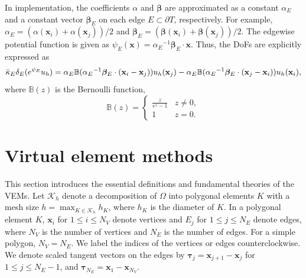 \documentclass[a4paper]{article}
\theoremstyle{plain}
\theoremstyle{definition}
\numberwithin{equation}{section}
\newcommand{\bx}{{\bf x}}
\begin{document}
In implementation, the coefficients $\alpha$ and $\bm{\beta}$ are approximated as a constant $\alpha_E$ and a constant vector $\bm{\beta}_E$ on each edge $E\subset\partial T$, respectively.
For example, $\alpha_E=(\alpha(\mathbf{x}_i)+\alpha(\mathbf{x}_j))/2$ and $\bm{\beta}_E=(\bm{\beta}(\mathbf{x}_i)+\bm{\beta}(\mathbf{x}_j))/2$.
The edgewise potential function is given as $\psi_E(\mathbf{x})={\alpha_E}^{-1}\bm{\beta}_E\cdot\mathbf{x}$.
Thus, the DoFs are explicitly expressed as
\begin{equation}\label{eqn: easy_computing}
\bar{\kappa}_E\delta_E(e^{\psi_E} u_h)=\alpha_E \mathbb{B}({\alpha_E}^{-1}\bm{\beta}_E\cdot(\mathbf{x}_{i}-\mathbf{x}_{j}))u_h(\mathbf{x}_j)-\alpha_E \mathbb{B}({\alpha_E}^{-1}\bm{\beta}_E\cdot(\mathbf{x}_{j}-\mathbf{x}_{i}))u_h(\bx_{i}),
\end{equation}
where $\mathbb{B}(z)$ is the Bernoulli function,
\begin{equation}
\mathbb{B}(z)=
\left\{
\begin{array}{cl}
\displaystyle\frac{z}{e^z-1}&  z\not=0,\\
1& z=0.
\end{array}
\right.
\label{bernoulli function}
\end{equation}





\section{Virtual element methods}\label{sec:VEM}
This section introduces the essential definitions and fundamental theories of the VEMs.
Let $\mathcal{K}_h$ denote a decomposition of $\Omega$ into polygonal elements $K$ with a mesh size
$h=\max_{K\in\mathcal{K}_h}h_K$, where $h_K$ is the diameter of $K$.
In a polygonal element $K$, $\mathbf{x}_i$ for $1\leq i\leq N_V$ denote vertices and $E_j$ for $1\leq j\leq N_E$ denote edges, where $N_V$ is the number of vertices and $N_E$ is the number of edges.
For a simple polygon, $N_V=N_E$. We label the indices of the vertices or edges counterclockwise.
We denote scaled tangent vectors on the edges by $\bm{\tau}_j=\mathbf{x}_{j+1}-\mathbf{x}_j$ for $1\leq j\leq N_E-1$, and $\bm{\tau}_{N_E}=\mathbf{x}_{1}-\mathbf{x}_{N_V}$.
\end{document}
